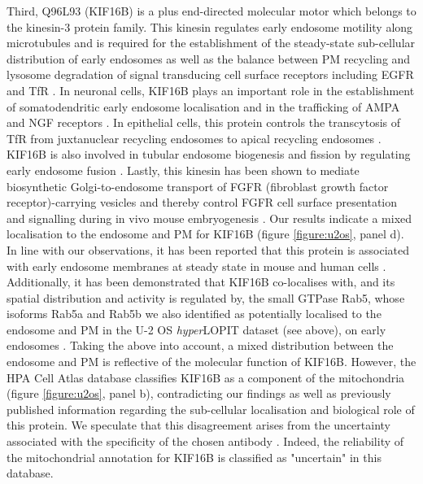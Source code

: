 \documentclass[12pt,english]{article}
\begin{document}
Third, Q96L93 (KIF16B) is a plus end-directed molecular motor which belongs to the kinesin-3 protein family. This kinesin regulates early endosome motility along microtubules and is required for the establishment of the steady-state sub-cellular distribution of early endosomes as well as the balance between PM recycling and lysosome degradation of signal transducing cell surface receptors including EGFR and TfR \citep{Hoepfner:2005, Carlucci::2010}. In neuronal cells, KIF16B plays an important role in the establishment of somatodendritic early endosome localisation and in the trafficking of AMPA and NGF receptors \citep{Farkhondeh::2015}. In epithelial cells, this protein controls the transcytosis of TfR from juxtanuclear recycling endosomes to apical recycling endosomes \citep{Bay::2013}. KIF16B is also involved in tubular endosome biogenesis and fission by regulating early endosome fusion \citep{Skjeldal::2012}. Lastly, this kinesin has been shown to mediate biosynthetic Golgi-to-endosome transport of FGFR (fibroblast growth factor receptor)-carrying vesicles and thereby control FGFR cell surface presentation and signalling during in vivo mouse embryogenesis \citep{Ueno::2011}. Our results indicate a mixed localisation to the endosome and PM for KIF16B (figure \ref{figure:u2os}, panel d). In line with our observations, it has been reported that this protein is associated with early endosome membranes at steady state in mouse and human cells \citep{Hoepfner:2005, Farkhondeh::2015}. Additionally, it has been demonstrated that KIF16B co-localises with, and its spatial distribution and activity is regulated by, the small GTPase Rab5, whose isoforms Rab5a and Rab5b we also identified as potentially localised to the endosome and PM in the U-2 OS \textit{hyper}LOPIT dataset (see above), on early endosomes \citep{Hoepfner:2005,Skjeldal::2012}. Taking the above into account, a mixed distribution between the endosome and PM is reflective of the molecular function of KIF16B. However, the HPA Cell Atlas database classifies KIF16B as a component of the mitochondria (figure \ref{figure:u2os}, panel b), contradicting our findings as well as previously published information regarding the sub-cellular localisation and biological role of this protein. We speculate that this disagreement arises from the uncertainty associated with the specificity of the chosen antibody \citep{Thul:2017}. Indeed, the reliability of the mitochondrial annotation for KIF16B is classified as "uncertain" in this database.
\end{document}
